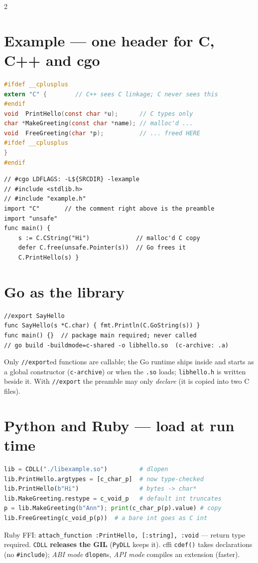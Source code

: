 \documentclass[8pt]{extarticle}
\begin{document}
\begin{multicols}{2}
\section{Example — one header for C, C++ and cgo}
\begin{lstlisting}[language=C, style=ffi]
#ifdef __cplusplus
extern "C" {        // C++ sees C linkage; C never sees this
#endif
void  PrintHello(const char *u);      // C types only
char *MakeGreeting(const char *name); // malloc'd ...
void  FreeGreeting(char *p);          // ... freed HERE
#ifdef __cplusplus
}
#endif
\end{lstlisting}
\begin{lstlisting}[language=GoSheet, style=ffi]
// #cgo LDFLAGS: -L${SRCDIR} -lexample
// #include <stdlib.h>
// #include "example.h"
import "C"       // the comment right above is the preamble
import "unsafe"
func main() {
    s := C.CString("Hi")             // malloc'd C copy
    defer C.free(unsafe.Pointer(s))  // Go frees it
    C.PrintHello(s) }
\end{lstlisting}

\section{Go as the library}
\begin{lstlisting}[language=GoSheet, style=ffi]
//export SayHello
func SayHello(s *C.char) { fmt.Println(C.GoString(s)) }
func main() {}  // package main required; never called
// go build -buildmode=c-shared -o libhello.so  (c-archive: .a)
\end{lstlisting}
Only \texttt{//export}ed functions are callable; the Go runtime ships inside and starts as a
global constructor (\texttt{c-archive}) or when the \texttt{.so} loads; \texttt{libhello.h} is
written beside it. With \texttt{//export} the preamble may only \emph{declare} (it is copied
into two C files).

\columnbreak

\section{Python and Ruby — load at run time}
\begin{lstlisting}[language=Python, style=ffi]
lib = CDLL("./libexample.so")         # dlopen
lib.PrintHello.argtypes = [c_char_p]  # now type-checked
lib.PrintHello(b"Hi")                 # bytes -> char*
lib.MakeGreeting.restype = c_void_p   # default int truncates
p = lib.MakeGreeting(b"Ann"); print(c_char_p(p).value) # copy
lib.FreeGreeting(c_void_p(p))  # a bare int goes as C int
\end{lstlisting}
Ruby FFI: \texttt{attach\_function :PrintHello, [:string], :void} — return type required.
\texttt{CDLL} \textbf{releases the GIL} (\texttt{PyDLL} keeps it). cffi \texttt{cdef()} takes
declarations (no \texttt{\#include}); \emph{ABI mode} \texttt{dlopen}s, \emph{API mode} compiles
an extension (faster).


\end{multicols}
\end{document}
